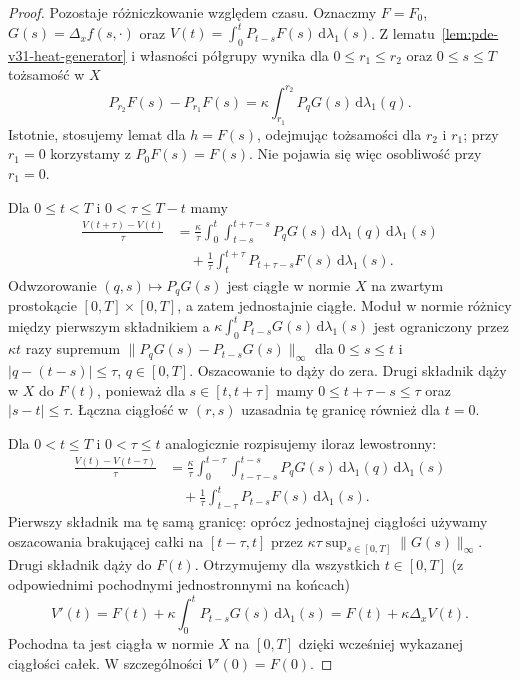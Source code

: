 \begin{proof}
Pozostaje różniczkowanie względem czasu. Oznaczmy
$F=F_0$, $G(s)=\Delta_x f(s,\cdot)$ oraz
$V(t)=\int_0^tP_{t-s}F(s)\,\mathrm d\lambda_1(s)$.
Z lematu~\ref{lem:pde-v31-heat-generator}
i własności półgrupy wynika dla $0\leq r_1\leq r_2$
oraz $0\leq s\leq T$ tożsamość w $X$
\[
 P_{r_2}F(s)-P_{r_1}F(s)
 =\kappa\int_{r_1}^{r_2}P_qG(s)\,\mathrm d\lambda_1(q).
\]
Istotnie, stosujemy lemat dla $h=F(s)$,
odejmując tożsamości dla $r_2$ i $r_1$;
przy $r_1=0$ korzystamy z $P_0F(s)=F(s)$.
Nie pojawia się więc osobliwość przy $r_1=0$.

Dla $0\leq t<T$ i $0<\tau\leq T-t$ mamy
\[
 \begin{aligned}
 \frac{V(t+\tau)-V(t)}{\tau}
 &=\frac{\kappa}{\tau}\int_0^t
       \int_{t-s}^{t+\tau-s}P_qG(s)\,
       \mathrm d\lambda_1(q)\,\mathrm d\lambda_1(s)\\
 &\quad+\frac1{\tau}\int_t^{t+\tau}P_{t+\tau-s}F(s)\,
                                  \mathrm d\lambda_1(s).
 \end{aligned}
\]
Odwzorowanie $(q,s)\mapsto P_qG(s)$ jest
ciągłe w normie $X$ na zwartym prostokącie
$[0,T]\times[0,T]$, a zatem jednostajnie ciągłe.
Moduł w normie różnicy między pierwszym składnikiem
a $\kappa\int_0^tP_{t-s}G(s)\,\mathrm d\lambda_1(s)$
jest ograniczony przez $\kappa t$ razy supremum
$\|P_qG(s)-P_{t-s}G(s)\|_\infty$ dla
$0\leq s\leq t$ i $|q-(t-s)|\leq\tau$,
$q\in[0,T]$. Oszacowanie to dąży do zera.
Drugi składnik dąży w $X$ do $F(t)$,
ponieważ dla $s\in[t,t+\tau]$ mamy
$0\leq t+\tau-s\leq\tau$ oraz $|s-t|\leq\tau$.
Łączna ciągłość w $(r,s)$ uzasadnia tę granicę
również dla $t=0$.

Dla $0<t\leq T$ i $0<\tau\leq t$ analogicznie
rozpisujemy iloraz lewostronny:
\[
 \begin{aligned}
 \frac{V(t)-V(t-\tau)}{\tau}
 &=\frac{\kappa}{\tau}\int_0^{t-\tau}
      \int_{t-\tau-s}^{t-s}P_qG(s)\,
       \mathrm d\lambda_1(q)\,\mathrm d\lambda_1(s)\\
 &\quad+\frac1{\tau}\int_{t-\tau}^tP_{t-s}F(s)\,
                                   \mathrm d\lambda_1(s).
 \end{aligned}
\]
Pierwszy składnik ma tę samą granicę: oprócz
jednostajnej ciągłości używamy oszacowania brakującej
całki na $[t-\tau,t]$ przez
$\kappa\tau\sup_{s\in[0,T]}\|G(s)\|_\infty$.
Drugi składnik dąży do $F(t)$.
Otrzymujemy dla wszystkich $t\in[0,T]$
(z odpowiednimi pochodnymi jednostronnymi na końcach)
\[
 V'(t)=F(t)+\kappa\int_0^tP_{t-s}G(s)\,
                     \mathrm d\lambda_1(s)
      =F(t)+\kappa\Delta_xV(t).
\]
Pochodna ta jest ciągła w normie $X$ na $[0,T]$
dzięki wcześniej wykazanej ciągłości całek.
W szczególności $V'(0)=F(0)$.


\end{proof}
